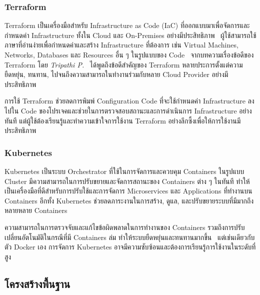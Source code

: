\documentclass[12pt,oneside,openright,a4paper]{cpe-thai-project}
\begin{document}
        \subsubsection{Terraform}
            \begin{flushleft}
                Terraform เป็นเครื่องมือสำหรับ Infrastructure as Code (IaC) ที่ออกแบบมาเพื่อจัดการและกำหนดค่า Infrastructure ทั้งใน Cloud และ On-Premises อย่างมีประสิทธิภาพ~\cite{terraform} ผู้ใช้สามารถใช้ภาษาที่อ่านง่ายเพื่อกำหนดค่าและสร้าง Infrastructure ที่ต้องการ เช่น Virtual Machines, Networks, Databases และ Resources อื่น ๆ ในรูปแบบของ Code~\cite{terraform} จากบทความเรื่องข้อดีของ Terraform โดย \textit{Tripathi P.}~\cite{tripathi23terraform} ได้พูดถึงข้อดีสำคัญของ Terraform หลายประการตั้งแต่ความยืดหยุ่น, ทนทาน, ไปจนถึงความสามารถในทำงานร่วมกับหลาย Cloud Provider อย่างมีประสิทธิภาพ 
            \end{flushleft}
            \begin{flushleft}
                การใช้ Terraform ช่วยลดการพิมพ์ Configuration Code ที่จะใช้กำหนดค่า Infrastructure ลงไปใน Code ของโปรเจคและช่วยในการตรวจสอบสถานะและการดำเนินการ Infrastructure อย่างทันที แต่ผู้ใช้ต้องเรียนรู้และทำความเข้าใจการใช้งาน Terraform อย่างลึกซึ้งเพื่อให้การใช้งานมีประสิทธิภาพ~\cite{stanfield22iac}
            \end{flushleft}
        \subsubsection{Kubernetes}
            \begin{flushleft}
                Kubernetes เป็นระบบ Orchestrator ที่ใช้ในการจัดการและควบคุม Containers ในรูปแบบ Cluster มีความสามารถในการปรับขยายและจัดการสถานะของ Containers ต่าง ๆ ในทันที ทำให้เป็นเครื่องมือที่ดีสำหรับการปรับใช้และการจัดการ Microservices และ Applications ที่ทำงานบน Containers อีกทั้ง Kubernetes ช่วยลดภาระงานในการสร้าง, ดูแล, และปรับขยายระบบที่มีมากถึงหลายหลาย Containers~\cite{kubernetes}
            \end{flushleft}
            \begin{flushleft}
                ความสามารถในการตรวจจับและแก้ไขข้อผิดพลาดในการทำงานของ Containers รวมถึงการปรับเปลี่ยนอัตโนมัติในกรณีที่มี Containers ล่ม ทำให้ระบบยืดหยุ่นและทนทานมากขึ้น~\cite{kubernetes} แต่เช่นเดียวกับตัว Docker เอง การจัดการ Kubernetes อาจมีความซับซ้อนและต้องการเรียนรู้การใช้งานในระดับที่สูง
            \end{flushleft}
    \subsection{โครงสร้างพื้นฐาน}
\end{document}
